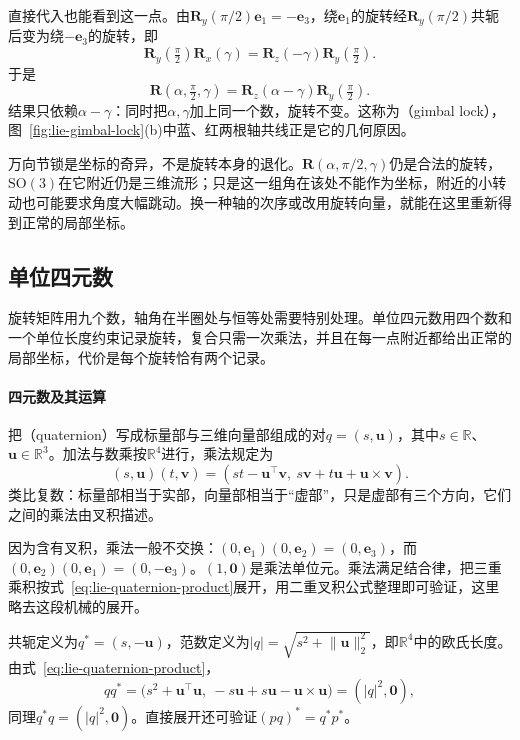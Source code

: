 直接代入也能看到这一点。由$\bm R_y(\pi/2)\bm e_1=-\bm e_3$，绕$\bm e_1$的旋转经$\bm R_y(\pi/2)$共轭后变为绕$-\bm e_3$的旋转，即
\[
\bm R_y(\tfrac\pi2)\bm R_x(\gamma)=\bm R_z(-\gamma)\bm R_y(\tfrac\pi2).
\]
于是
\[
\bm R(\alpha,\tfrac\pi2,\gamma)=\bm R_z(\alpha-\gamma)\bm R_y(\tfrac\pi2).
\]
结果只依赖$\alpha-\gamma$：同时把$\alpha,\gamma$加上同一个数，旋转不变。这称为（gimbal lock），图~\ref{fig:lie-gimbal-lock}(b)中蓝、红两根轴共线正是它的几何原因。

万向节锁是坐标的奇异，不是旋转本身的退化。$\bm R(\alpha,\pi/2,\gamma)$仍是合法的旋转，$\mathrm{SO}(3)$在它附近仍是三维流形；只是这一组角在该处不能作为坐标，附近的小转动也可能要求角度大幅跳动。换一种轴的次序或改用旋转向量，就能在这里重新得到正常的局部坐标。

\subsection{单位四元数}
\label{sec:lie-unit-quaternions}

旋转矩阵用九个数，轴角在半圈处与恒等处需要特别处理。单位四元数用四个数和一个单位长度约束记录旋转，复合只需一次乘法，并且在每一点附近都给出正常的局部坐标，代价是每个旋转恰有两个记录。

\paragraph{四元数及其运算}
把（quaternion）写成标量部与三维向量部组成的对$q=(s,\bm u)$，其中$s\in\mathbb R$、$\bm u\in\mathbb R^3$。加法与数乘按$\mathbb R^4$进行，乘法规定为
\begin{equation}
 (s,\bm u)(t,\bm v)=(st-\bm u^\top\bm v,\ s\bm v+t\bm u+\bm u\times\bm v).
 \label{eq:lie-quaternion-product}
\end{equation}
类比复数：标量部相当于实部，向量部相当于“虚部”，只是虚部有三个方向，它们之间的乘法由叉积描述。

因为含有叉积，乘法一般不交换：$(0,\bm e_1)(0,\bm e_2)=(0,\bm e_3)$，而$(0,\bm e_2)(0,\bm e_1)=(0,-\bm e_3)$。$(1,\bm0)$是乘法单位元。乘法满足结合律，把三重乘积按式~\eqref{eq:lie-quaternion-product}展开，用二重叉积公式整理即可验证，这里略去这段机械的展开。

共轭定义为$q^*=(s,-\bm u)$，范数定义为$\lvert q\rvert=\sqrt{s^2+\lVert\bm u\rVert_2^2}$，即$\mathbb R^4$中的欧氏长度。由式~\eqref{eq:lie-quaternion-product}，
\[
qq^*=\bigl(s^2+\bm u^\top\bm u,\ -s\bm u+s\bm u-\bm u\times\bm u\bigr)
=(\lvert q\rvert^2,\bm0),
\]
同理$q^*q=(\lvert q\rvert^2,\bm0)$。直接展开还可验证$(pq)^*=q^*p^*$。

